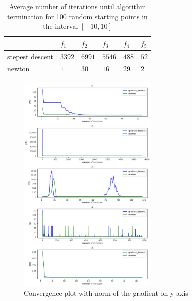 \documentclass[a4paper]{article}
\begin{document}
\begin{table}[]
\centering
\begin{tabular}{|l|l|l|l|l|l|}
\hline
                 & $f_1$ & $f_2$   & $f_3$  & $f_4$  & $f_5$ \\ \hline
stepest descent & $3392$ & $6991$ & $5546$ & $488$ & $52$ \\ \hline
newton           & $1$  & $30$   & $16$  & $29$  & $2 $ \\ \hline
\end{tabular}
\caption{Average number of iterations until algorithm termination for 100 random starting points in the interval $[-10,10]$}
\label{table2}
\end{table}

\begin{figure}[]
    \centering
    \includegraphics[width=0.6\textwidth]{plt_grad100.png}
    \caption{Convergence plot with norm of the gradient on y-axis}
  \label{plt1}
\end{figure}
\end{document}
